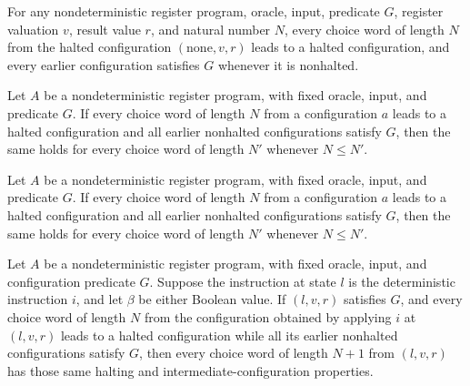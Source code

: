 \begin{lemma}
\label{Complexity.LogProg.NHalts.halted}
\leanok
{}
For any nondeterministic register program, oracle, input, predicate $G$, register
valuation $v$, result value $r$, and natural number $N$, every choice word of length $N$
from the halted configuration $(\mathrm{none},v,r)$ leads to a halted configuration, and
every earlier configuration satisfies $G$ whenever it is nonhalted.
\end{lemma}

\begin{lemma}
\label{Complexity.LogProg.NHalts.mono}
\leanok
{}
Let $A$ be a nondeterministic register program, with fixed oracle, input, and predicate
$G$. If every choice word of length $N$ from a configuration $a$ leads to a halted
configuration and all earlier nonhalted configurations satisfy $G$, then the same holds
for every choice word of length $N'$ whenever $N\le N'$.
\end{lemma}

\begin{lemma}
\label{Complexity.LogProg.NHalts.mono_len}
\leanok
{}
Let $A$ be a nondeterministic register program, with fixed oracle, input, and predicate
$G$. If every choice word of length $N$ from a configuration $a$ leads to a halted
configuration and all earlier nonhalted configurations satisfy $G$, then the same holds
for every choice word of length $N'$ whenever $N\le N'$.
\end{lemma}

\begin{lemma}
\label{Complexity.LogProg.NHalts.det}
\leanok
{}
Let $A$ be a nondeterministic register program, with fixed oracle, input, and
configuration predicate $G$. Suppose the instruction at state $l$ is the deterministic
instruction $i$, and let $\beta$ be either Boolean value. If $(l,v,r)$ satisfies $G$,
and every choice word of length $N$ from the configuration obtained by applying $i$ at
$(l,v,r)$ leads to a halted configuration while all its earlier nonhalted configurations
satisfy $G$, then every choice word of length $N+1$ from $(l,v,r)$ has those same
halting and intermediate-configuration properties.
\end{lemma}

